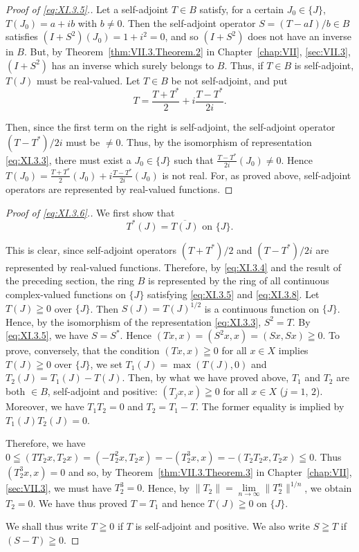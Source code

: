 \begin{proof}[Proof of \eqref{eq:XI.3.5}.]
Let a self-adjoint $T \in B$ satisfy, for a certain $J_0 \in \{J\}$, $T(J_0) = a + ib$ with $b \neq 0$. Then the self-adjoint operator $S = (T - aI)/b \in B$ satisfies $(I + S^2)(J_0) = 1 + i^2 = 0$, and so $(I + S^2)$ does not have an inverse in $B$. But, by Theorem~\ref{thm:VII.3.Theorem.2} in Chapter~\ref{chap:VII}, \ref{sec:VII.3}, $(I + S^2)$ has an inverse which surely belongs to $B$. Thus, if $T \in B$ is self-adjoint, $T(J)$ must be real-valued. Let $T \in B$ be not self-adjoint, and put
\[
T = \frac {T + T ^{*}}{2} + i \frac {T - T ^{*}}{2 i}.
\]

Then, since the first term on the right is self-adjoint, the self-adjoint operator $(T - T^{*}) / 2i$ must be $\neq 0$. Thus, by the isomorphism of representation \eqref{eq:XI.3.3}, there must exist a $J_0 \in \{J\}$ such that $\frac{T - T^*}{2i}(J_0) \neq 0$. Hence $T(J_0) = \frac{T + T^*}{2}(J_0) + i\frac{T - T^*}{2i}(J_0)$ is not real. For, as proved above, self-adjoint operators are represented by real-valued functions. 
\end{proof}

\begin{proof}[Proof of \eqref{eq:XI.3.6}.]
We first show that
\begin{equation}\label{eq:XI.3.8}
T ^{*} (J) = \overline {{{{T (J)}}}} \text{ on } \{J \}.
\end{equation}

This is clear, since self-adjoint operators $(T + T^{*})/2$ and $(T - T^{*})/2i$ are represented by real-valued functions. Therefore, by \eqref{eq:XI.3.4} and the result of the preceding section, the ring $B$ is represented by the ring of all continuous complex-valued functions on $\{J\}$ satisfying \eqref{eq:XI.3.5} and \eqref{eq:XI.3.8}. Let $T(J) \geqq 0$ over $\{J\}$. Then $S(J) = T(J)^{1/2}$ is a continuous function on $\{J\}$. Hence, by the isomorphism of the representation \eqref{eq:XI.3.3}, $S^{2} = T$. By \eqref{eq:XI.3.5}, we have $S = S^{*}$. Hence $(Tx, x) = (S^{2}x, x) = (Sx, Sx) \geqq 0$. To prove, conversely, that the condition $(Tx, x) \geqq 0$ for all $x \in X$ implies $T(J) \geqq 0$ over $\{J\}$, we set $T_{1}(J) = \max(T(J), 0)$ and $T_{2}(J) = T_{1}(J) - T(J)$. Then, by what we have proved above, $T_{1}$ and $T_{2}$ are both $\in B$, self-adjoint and positive: $(T_{j}x, x) \geqq 0$ for all $x \in X$ ($j = 1$, $2$). Moreover, we have $T_{1}T_{2} = 0$ and $T_{2} = T_{1} - T$. The former equality is implied by $T_{1}(J)T_{2}(J) = 0$. 

Therefore, we have 
$0 \leqq (TT_{2}x, T_{2}x) = (-T_{2}^{2}x, T_{2}x) = -(T_{2}^{3}x, x) = -(T_{2}T_{2}x, T_{2}x) \leqq 0$. Thus $(T_{2}^{3}x, x) = 0$ and so, by Theorem~\ref{thm:VII.3.Theorem.3} in Chapter~\ref{chap:VII}, \ref{sec:VII.3}, we must have $T_{2}^{3} = 0$. Hence, by $\|T_{2}\| = \lim\limits_{n \to \infty} \|T_{2}^{n}\|^{1/n}$, we obtain $T_{2} = 0$. We have thus proved $T = T_{1}$ and hence $T(J) \geqq 0$ on $\{J\}$. 

We shall thus write $T \geqq 0$ if $T$ is self-adjoint and positive. We also write $S \geqq T$ if $(S - T) \geqq 0$. 
\end{proof}

